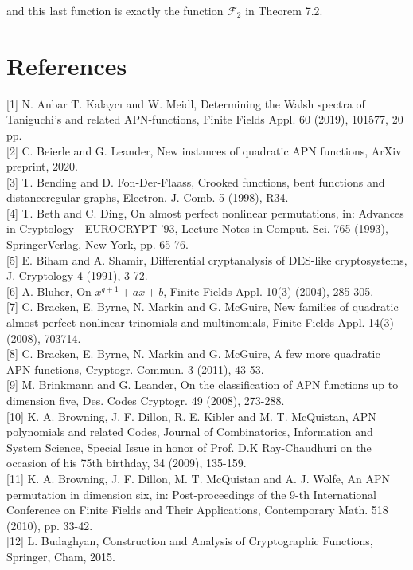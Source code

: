 \documentclass[10pt]{article}
\begin{document}
and this last function is exactly the function $\mathcal{F}_{2}$ in Theorem 7.2.

\section*{References}
[1] N. Anbar T. Kalaycı and W. Meidl, Determining the Walsh spectra of Taniguchi's and related APN-functions, Finite Fields Appl. 60 (2019), 101577, 20 pp.\\[0pt]
[2] C. Beierle and G. Leander, New instances of quadratic APN functions, ArXiv preprint, 2020.\\[0pt]
[3] T. Bending and D. Fon-Der-Flaass, Crooked functions, bent functions and distanceregular graphs, Electron. J. Comb. 5 (1998), R34.\\[0pt]
[4] T. Beth and C. Ding, On almost perfect nonlinear permutations, in: Advances in Cryptology - EUROCRYPT '93, Lecture Notes in Comput. Sci. 765 (1993), SpringerVerlag, New York, pp. 65-76.\\[0pt]
[5] E. Biham and A. Shamir, Differential cryptanalysis of DES-like cryptosystems, J. Cryptology 4 (1991), 3-72.\\[0pt]
[6] A. Bluher, On $x^{q+1}+a x+b$, Finite Fields Appl. 10(3) (2004), 285-305.\\[0pt]
[7] C. Bracken, E. Byrne, N. Markin and G. McGuire, New families of quadratic almost perfect nonlinear trinomials and multinomials, Finite Fields Appl. 14(3) (2008), 703714.\\[0pt]
[8] C. Bracken, E. Byrne, N. Markin and G. McGuire, A few more quadratic APN functions, Cryptogr. Commun. 3 (2011), 43-53.\\[0pt]
[9] M. Brinkmann and G. Leander, On the classification of APN functions up to dimension five, Des. Codes Cryptogr. 49 (2008), 273-288.\\[0pt]
[10] K. A. Browning, J. F. Dillon, R. E. Kibler and M. T. McQuistan, APN polynomials and related Codes, Journal of Combinatorics, Information and System Science, Special Issue in honor of Prof. D.K Ray-Chaudhuri on the occasion of his 75th birthday, 34 (2009), 135-159.\\[0pt]
[11] K. A. Browning, J. F. Dillon, M. T. McQuistan and A. J. Wolfe, An APN permutation in dimension six, in: Post-proceedings of the 9-th International Conference on Finite Fields and Their Applications, Contemporary Math. 518 (2010), pp. 33-42.\\[0pt]
[12] L. Budaghyan, Construction and Analysis of Cryptographic Functions, Springer, Cham, 2015.\\[0pt]
\end{document}
